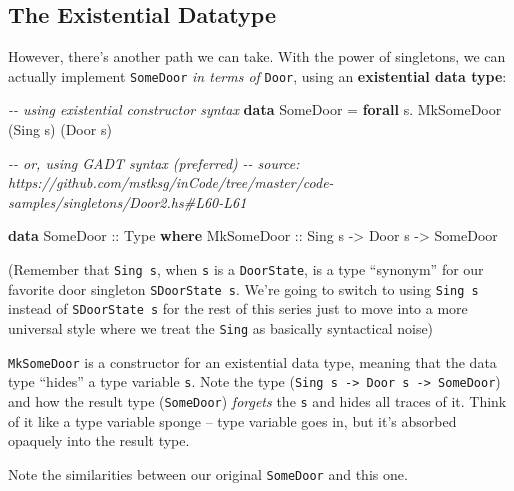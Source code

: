 \documentclass[]{article}
\newenvironment{Shaded}{}{}
\newcommand{\CommentTok}[1]{\textcolor[rgb]{0.38,0.63,0.69}{\textit{#1}}}
\newcommand{\DataTypeTok}[1]{\textcolor[rgb]{0.56,0.13,0.00}{#1}}
\newcommand{\KeywordTok}[1]{\textcolor[rgb]{0.00,0.44,0.13}{\textbf{#1}}}
\newcommand{\NormalTok}[1]{#1}
\newcommand{\OperatorTok}[1]{\textcolor[rgb]{0.40,0.40,0.40}{#1}}
\newcommand{\OtherTok}[1]{\textcolor[rgb]{0.00,0.44,0.13}{#1}}
\begin{document}
\subsection{The Existential Datatype}\label{the-existential-datatype}

However, there's another path we can take. With the power of singletons, we can
actually implement \texttt{SomeDoor} \emph{in terms of} \texttt{Door}, using an
\textbf{existential data type}:

\begin{Shaded}
\begin{Highlighting}[]
\CommentTok{{-}{-} using existential constructor syntax}
\KeywordTok{data} \DataTypeTok{SomeDoor} \OtherTok{=} \KeywordTok{forall}\NormalTok{ s}\OperatorTok{.} \DataTypeTok{MkSomeDoor}\NormalTok{ (}\DataTypeTok{Sing}\NormalTok{ s) (}\DataTypeTok{Door}\NormalTok{ s)}

\CommentTok{{-}{-} or, using GADT syntax (preferred)}
\CommentTok{{-}{-} source: https://github.com/mstksg/inCode/tree/master/code{-}samples/singletons/Door2.hs\#L60{-}L61}

\KeywordTok{data} \DataTypeTok{SomeDoor}\OtherTok{ ::} \DataTypeTok{Type} \KeywordTok{where}
    \DataTypeTok{MkSomeDoor}\OtherTok{ ::} \DataTypeTok{Sing}\NormalTok{ s }\OtherTok{{-}\textgreater{}} \DataTypeTok{Door}\NormalTok{ s }\OtherTok{{-}\textgreater{}} \DataTypeTok{SomeDoor}
\end{Highlighting}
\end{Shaded}

(Remember that \texttt{Sing\ s}, when \texttt{s} is a \texttt{DoorState}, is a
type ``synonym'' for our favorite door singleton \texttt{SDoorState\ s}. We're
going to switch to using \texttt{Sing\ s} instead of \texttt{SDoorState\ s} for
the rest of this series just to move into a more universal style where we treat
the \texttt{Sing} as basically syntactical noise)

\texttt{MkSomeDoor} is a constructor for an existential data type, meaning that
the data type ``hides'' a type variable \texttt{s}. Note the type
(\texttt{Sing\ s\ -\textgreater{}\ Door\ s\ -\textgreater{}\ SomeDoor}) and how
the result type (\texttt{SomeDoor}) \emph{forgets} the \texttt{s} and hides all
traces of it. Think of it like a type variable sponge -- type variable goes in,
but it's absorbed opaquely into the result type.

Note the similarities between our original \texttt{SomeDoor} and this one.
\end{document}
